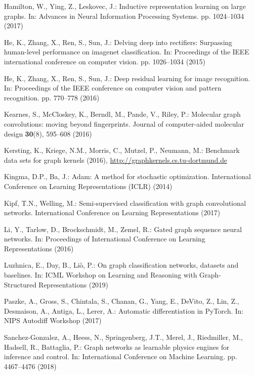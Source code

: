 \documentclass[runningheads]{llncs}
\begin{document}
\begin{thebibliography}{10}
Hamilton, W., Ying, Z., Leskovec, J.: Inductive representation learning on
  large graphs. In: Advances in Neural Information Processing Systems. pp.
  1024--1034 (2017)

He, K., Zhang, X., Ren, S., Sun, J.: Delving deep into rectifiers: Surpassing
  human-level performance on imagenet classification. In: Proceedings of the
  IEEE international conference on computer vision. pp. 1026--1034 (2015)

He, K., Zhang, X., Ren, S., Sun, J.: Deep residual learning for image
  recognition. In: Proceedings of the IEEE conference on computer vision and
  pattern recognition. pp. 770--778 (2016)

Kearnes, S., McCloskey, K., Berndl, M., Pande, V., Riley, P.: Molecular graph
  convolutions: moving beyond fingerprints. Journal of computer-aided molecular
  design  \textbf{30}(8),  595--608 (2016)

Kersting, K., Kriege, N.M., Morris, C., Mutzel, P., Neumann, M.: Benchmark data
  sets for graph kernels (2016), \url{http://graphkernels.cs.tu-dortmund.de}

Kingma, D.P., Ba, J.: Adam: A method for stochastic optimization. International
  Conference on Learning Representations (ICLR)  (2014)

Kipf, T.N., Welling, M.: Semi-supervised classification with graph
  convolutional networks. International Conference on Learning Representations
  (2017)

Li, Y., Tarlow, D., Brockschmidt, M., Zemel, R.: Gated graph sequence neural
  networks. In: Proceedings of International Conference on Learning
  Representations (2016)

Luzhnica, E., Day, B., Li{\`o}, P.: On graph classification networks, datasets
  and baselines. In: ICML Workshop on Learning and Reasoning with
  Graph-Structured Representations (2019)

Paszke, A., Gross, S., Chintala, S., Chanan, G., Yang, E., DeVito, Z., Lin, Z.,
  Desmaison, A., Antiga, L., Lerer, A.: Automatic differentiation in {PyTorch}.
  In: NIPS Autodiff Workshop (2017)

Sanchez-Gonzalez, A., Heess, N., Springenberg, J.T., Merel, J., Riedmiller, M.,
  Hadsell, R., Battaglia, P.: Graph networks as learnable physics engines for
  inference and control. In: International Conference on Machine Learning. pp.
  4467--4476 (2018)


\end{thebibliography}
\end{document}
